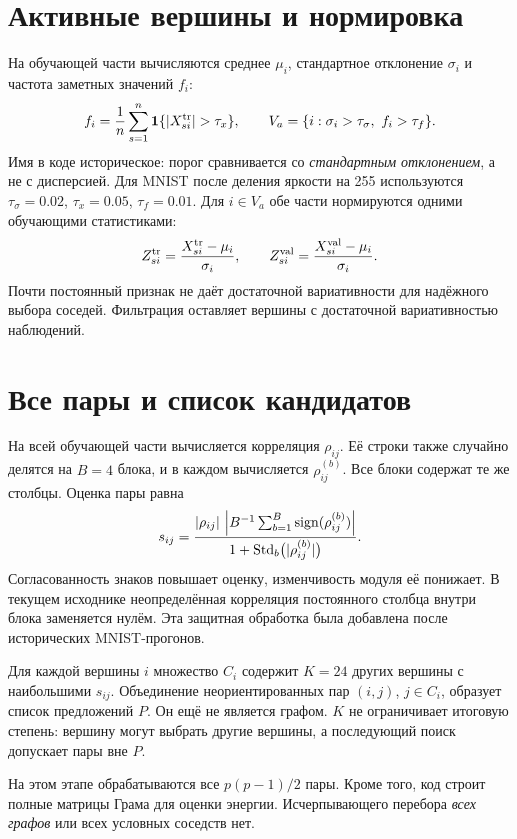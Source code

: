 \documentclass[11pt,a4paper]{article}
\begin{document}
\section{Активные вершины и нормировка}
На обучающей части вычисляются среднее $\mu_i$, стандартное отклонение $\sigma_i$
и частота заметных значений $f_i$:
\begin{equation}
 f_i=\frac1n\sum_{s=1}^n\mathbf1\{|X^{\rm tr}_{si}|>\tau_x\},\qquad
 V_a=\{i:\sigma_i>\tau_\sigma,\ f_i>\tau_f\}.
\end{equation}
Имя  в коде историческое: порог сравнивается
со \emph{стандартным отклонением}, а не с дисперсией.
Для MNIST после деления яркости на 255 используются
$\tau_\sigma=0.02$, $\tau_x=0.05$, $\tau_f=0.01$.
Для $i\in V_a$ обе части нормируются одними обучающими статистиками:
\begin{equation}
 Z^{\rm tr}_{si}=\frac{X^{\rm tr}_{si}-\mu_i}{\sigma_i},\qquad
 Z^{\rm val}_{si}=\frac{X^{\rm val}_{si}-\mu_i}{\sigma_i}.
\end{equation}
Почти постоянный признак не даёт достаточной вариативности для надёжного выбора соседей.
Фильтрация оставляет вершины с достаточной вариативностью наблюдений.

\section{Все пары и список кандидатов}
На всей обучающей части вычисляется корреляция $\rho_{ij}$.
Её строки также случайно делятся на $B=4$ блока, и в каждом вычисляется $\rho^{(b)}_{ij}$.
Все блоки содержат те же столбцы. Оценка пары равна
\begin{equation}
 s_{ij}=\frac{|\rho_{ij}|\,
 \left|B^{-1}\sum_{b=1}^B\operatorname{sign}(\rho^{(b)}_{ij})\right|}
 {1+\operatorname{Std}_b\bigl(|\rho^{(b)}_{ij}|\bigr)}.
\end{equation}
Согласованность знаков повышает оценку, изменчивость модуля её понижает.
В текущем исходнике неопределённая корреляция постоянного столбца внутри блока
заменяется нулём. Эта защитная обработка была добавлена после исторических MNIST-прогонов.
\par Для каждой вершины $i$ множество $C_i$ содержит $K=24$ других вершины с наибольшими $s_{ij}$.
Объединение неориентированных пар $(i,j)$, $j\in C_i$, образует список предложений $P$.
Он ещё не является графом. $K$ не ограничивает итоговую степень: вершину могут выбрать
другие вершины, а последующий поиск допускает пары вне $P$.
\par На этом этапе обрабатываются все $p(p-1)/2$ пары. Кроме того, код строит полные
матрицы Грама для оценки энергии. Исчерпывающего перебора \emph{всех графов}
или всех условных соседств нет.
\end{document}
